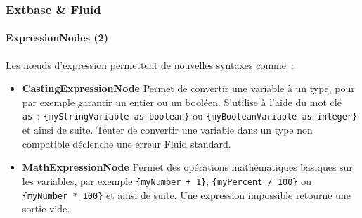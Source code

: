 
\begin{frame}[fragile]
	\frametitle{Extbase \& Fluid}
	\framesubtitle{ExpressionNodes (2)}

	Les nœuds d'expression permettent de nouvelles syntaxes comme~:

	\begin{itemize}

		\item \textbf{CastingExpressionNode}\newline
			\small
				Permet de convertir une variable à un type, pour par exemple garantir
				un entier ou un booléen. S'utilise à l'aide du mot clé \texttt{as}~:
				\texttt{\{myStringVariable as boolean\}} ou
				\texttt{\{myBooleanVariable as integer\}} et ainsi de suite.
				Tenter de convertir une variable dans un type non compatible déclenche
				une erreur Fluid standard.
			\normalsize

		\item \textbf{MathExpressionNode}\newline
			\small
				Permet des opérations mathématiques basiques sur les variables, par exemple
				\texttt{\{myNumber + 1\}}, \texttt{\{myPercent / 100\}} ou
				\texttt{\{myNumber * 100\}} et ainsi de suite.
				Une expression impossible retourne une sortie vide.
			\normalsize

	\end{itemize}

\end{frame}


